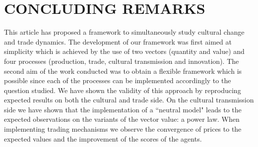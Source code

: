 \documentclass{wscpaperproc}
\newcommand{\memo}[2]{\textcolor{#1}{#2}}
\renewcommand{\memo}[2]{} %
\newcommand{\simon}[1]{\memo{green}{Simon: #1\\}}
\begin{document}
%
%

\section{CONCLUDING REMARKS}

This article has proposed a framework to simultaneously study cultural change and trade dynamics. The development of our framework was first aimed at simplicity which is achieved by the use of two vectors (quantity and value) and four processes (production, trade, cultural transmission and innovation). The second aim of the work conducted was to obtain a flexible framework which is possible since each of the processes can be implemented accordingly to the question studied. We have shown the validity of this approach by reproducing expected results on both the cultural and trade side. On the cultural transmission side we have shown that the implementation of a ``neutral model" leads to the expected observations on the variants of the vector value: a power law. When implementing trading mechanisms we observe the convergence of prices to the expected values and the improvement of the scores of the agents.
\end{document}
